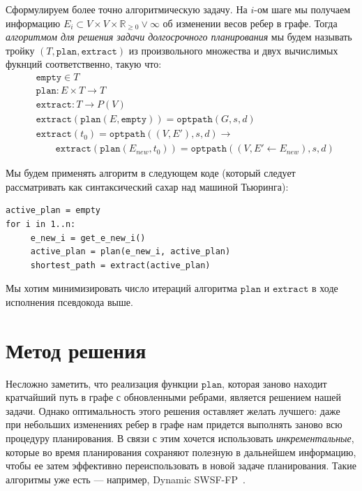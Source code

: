 \documentclass[11pt]{article}
\newcommand{\realpositive}{\mathbb{R}_{\geqslant 0}}
\begin{document}
    \newcommand{\fplan}{\mathtt{plan}}
    \newcommand{\fextract}{\mathtt{extract}}
    \newcommand{\fempty}{\mathtt{empty}}
    Сформулируем более точно алгоритмическую задачу.
    На $i$-ом шаге мы получаем информацию $E_i \subset V \times V \times \realpositive \lor \infty$ об изменении весов ребер в графе.
    Тогда \textit{алгоритмом для решения задачи долгосрочного планирования} мы будем называть тройку $(T, \fplan, \fextract)$ из произвольного множества и двух вычислимых фукнций соответственно, такую что:
    \begin{align*}
        &\fempty \in T \\
        &\fplan: E \times T \rightarrow T \\
        &\fextract: T \rightarrow P(V) \\
        &\fextract(\fplan(E, \fempty)) = \mathtt{optpath}(G, s, d) \\
        &\fextract(t_0) = \mathtt{optpath}((V, E'), s, d) \rightarrow \\
        &\qquad \fextract(\fplan(E_{new}, t_0)) = \mathtt{optpath}((V, E' \leftarrow E_{new}), s, d)
    \end{align*}

    Мы будем применять алгоритм в следующем коде (который следует рассматривать как синтаксический сахар над машиной Тьюринга):
    \begin{verbatim}
active_plan = empty
for i in 1..n:
     e_new_i = get_e_new_i()
     active_plan = plan(e_new_i, active_plan)
     shortest_path = extract(active_plan)
    \end{verbatim}
    Мы хотим минимизировать число итераций алгоритма $\fplan$ и $\fextract$ в ходе исполнения псевдокода выше.


    \section{Метод решения}

    Несложно заметить, что реализация функции \(\fplan\), которая заново находит кратчайший путь в графе с обновленными ребрами, является решением нашей задачи.
    Однако оптимальность этого решения оставляет желать лучшего: даже при небольших изменениях ребер в графе нам придется выполнять заново всю процедуру планирования.
    В связи с этим хочется использовать \textit{инкрементальные}, которые во время планирования сохраняют полезную в дальнейшем информацию, чтобы ее затем эффективно переиспользовать в новой задаче планирования.
    Такие алгоритмы уже есть --- например, Dynamic SWSF-FP~\cite{RAMALINGAM1996267}.
\end{document}
